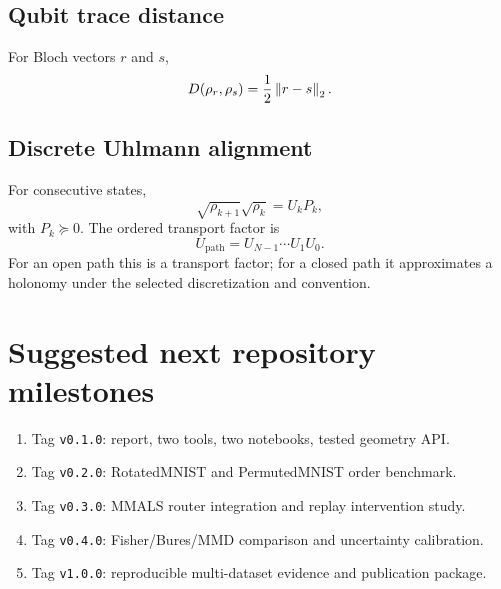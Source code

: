 \subsection{Qubit trace distance}

For Bloch vectors $r$ and $s$,
\[
D(\rho_r,\rho_s)=\frac12\left\lVert r-s \right\rVert_2.
\]

\subsection{Discrete Uhlmann alignment}

For consecutive states,
\[
\sqrt{\rho_{k+1}}\sqrt{\rho_k}=U_kP_k,
\]
with $P_k\succeq0$. The ordered transport factor is
\[
U_{\mathrm{path}}=U_{N-1}\cdots U_1U_0.
\]
For an open path this is a transport factor; for a closed path it approximates a holonomy under the selected discretization and convention.

\section{Suggested next repository milestones}

\begin{enumerate}
  \item Tag \texttt{v0.1.0}: report, two tools, two notebooks, tested geometry API.
  \item Tag \texttt{v0.2.0}: RotatedMNIST and PermutedMNIST order benchmark.
  \item Tag \texttt{v0.3.0}: MMALS router integration and replay intervention study.
  \item Tag \texttt{v0.4.0}: Fisher/Bures/MMD comparison and uncertainty calibration.
  \item Tag \texttt{v1.0.0}: reproducible multi-dataset evidence and publication package.
\end{enumerate}

